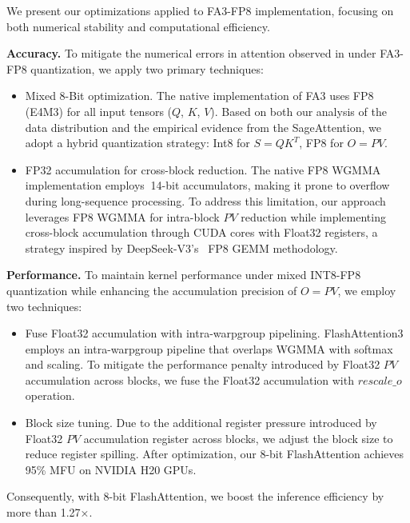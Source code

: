 We present our optimizations applied to FA3-FP8 implementation, focusing on both numerical stability and computational efficiency. 


\textbf{Accuracy.} To mitigate the numerical errors in attention observed in \method under FA3-FP8 quantization, we apply two primary techniques:

\begin{itemize}
    \item Mixed 8-Bit optimization. The native implementation of FA3 uses FP8 (E4M3) for all input tensors (\(Q\), \(K\), \(V\)). Based on both our analysis of the data distribution and the empirical evidence from the SageAttention, we adopt a hybrid quantization strategy: Int8 for \(S=QK^T\), FP8 for \(O=PV\).
    \item FP32 accumulation for cross-block reduction. The native FP8 WGMMA implementation employs $~$14-bit accumulators, making it prone to overflow during long-sequence processing. To address this limitation, our approach leverages FP8 WGMMA for intra-block \(PV\) reduction while implementing cross-block accumulation through CUDA cores with Float32 registers, a strategy inspired by DeepSeek-V3’s~\citep{liu2024deepseek} FP8 GEMM methodology.
\end{itemize}


\textbf{Performance.} To maintain kernel performance under mixed INT8-FP8 quantization while enhancing the accumulation precision of \(O=PV\), we employ two techniques:
\begin{itemize}
    \item Fuse Float32 accumulation with intra-warpgroup pipelining. FlashAttention3 employs an intra-warpgroup pipeline that overlaps WGMMA with softmax and scaling. To mitigate the performance penalty introduced by Float32 \(PV\) accumulation across blocks, we fuse the Float32 accumulation with \(rescale\_o\) operation.
    \item Block size tuning. Due to the additional register pressure introduced by Float32 \(PV\) accumulation register across blocks, we adjust the block size to reduce register spilling. After optimization, our 8-bit FlashAttention achieves 95\% MFU on NVIDIA H20 GPUs.
\end{itemize}

Consequently, with 8-bit FlashAttention, we boost the inference efficiency by more than 1.27×.